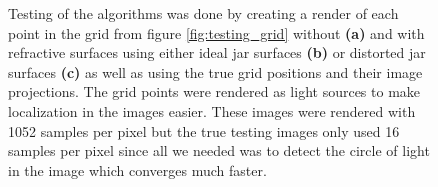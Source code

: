 \documentclass[11pt, letterpaper]{extarticle} %
\begin{document}
\begin{figure}[h]
    \centering
    \hfill
    \hfill
    \caption{Testing of the algorithms was done by creating a render of each point in the grid from figure \ref{fig:testing_grid} without \textbf{(a)} and with refractive surfaces using either ideal jar surfaces \textbf{(b)} or distorted jar surfaces \textbf{(c)} as well as using the true grid positions and their image projections. The grid points were rendered as light sources to make localization in the images easier. These images were rendered with 1052 samples per pixel but the true testing images only used 16 samples per pixel since all we needed was to detect the circle of light in the image which converges much faster.}
    \label{fig:grid_lights}
\end{figure}
\end{document}
